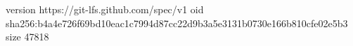 version https://git-lfs.github.com/spec/v1
oid sha256:b4a4e726f69bd10eac1c7994d87cc22d9b3a5e3131b0730e166b810cfe02e5b3
size 47818
